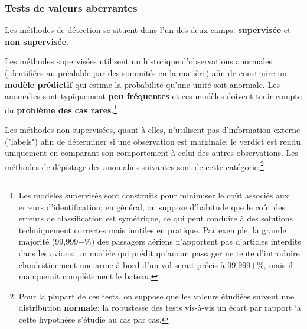 \subsubsection*{Tests de valeurs aberrantes} Les méthodes de d\'etection se situent dans l'un des deux camps: \textbf{supervis\'ee} et \textbf{non supervis\'ee}.
\par Les méthodes supervisées utilisent un historique d'ob\-ser\-va\-tions anormales (identifi\'ees au pr\'ealable par des sommit\'es en la mati\`ere) afin de construire un \textbf{mod\`ele pr\'edictif} qui estime la probabilité qu'une unité soit anormale. Les anomalies sont typiquement \textbf{peu fréquentes} et ces modèles doivent tenir compte du \textbf{problème des cas rares}.\footnote{Les modèles supervisés sont construits pour minimiser le co\^ut associ\'es aux erreurs d'identification; en g\'en\'eral, on suppose d'habitude que le coût des erreurs de classification est symétrique, ce qui peut conduire à des solutions techniquement correctes mais inutiles en pratique. Par exemple, la grande majorité (99,999+\%) des passagers aériens n'apportent pas d'articles interdits dans les avions; un modèle qui prédit qu'aucun passager ne tente d'introduire clandestinement une arme à bord d'un vol serait précis à 99,999+\%, mais il manquerait complètement le bateau.} \par Les méthodes non supervisées, quant \`a elles, n'utilisent pas d'information externe ("labels") afin de déterminer si une ob\-ser\-va\-tion est marginale; le verdict est rendu uniquement en comparant son comportement à celui des autres ob\-ser\-va\-tions.
\newpage\noindent Les m\'ethodes de d\'epistage des anomalies suivantes sont de cette cat\'egorie:\footnote{Pour la plupart de ces tests, on suppose que les valeurs \'etudi\'ees suivent une distribution \textbf{normale}; la robustesse des tests vis-\`a-vis un \'ecart par rapport `a cette hypoth\`ese s'\'etudie au cas par cas.}
